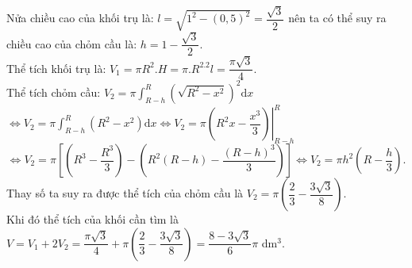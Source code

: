 \begin{ex}
{		Nửa chiều cao của khối trụ là: $l=\sqrt{1^2-(0,5)^2}=\dfrac{\sqrt{3}}{2}$ nên ta có thể suy ra chiều cao  của chỏm cầu là: $h=1-\dfrac{\sqrt{3}}{2}$.\\
		Thể tích khối  trụ là: $V_1=\pi R^2.H=\pi.R^2.2l=\dfrac{\pi \sqrt{3}}{4}$.\\
		Thể tích chỏm cầu: $V_2=\pi \displaystyle\int_{R-h}^R\left(\sqrt{R^2-x^2} \right)^2 \mathrm{d}x$ $\Leftrightarrow V_2=\pi \displaystyle\int_{R-h}^R\left(R^2-x^2\right)  \mathrm{d}x\Leftrightarrow V_2=\pi \left. \left(R^2x-\dfrac{x^3}{3} \right)\right|_{R-h}^R$
		\[\Leftrightarrow V_2=\pi \left[\left(R^3-\dfrac{R^3}{3} \right)-\left(R^2(R-h)-\dfrac{(R-h)^3}{3} \right)\right]\Leftrightarrow V_2=\pi  h^2\left(R-\dfrac{h}{3}\right).\]
		Thay số ta suy  ra được thể tích của chỏm cầu là $V_2=\pi \left(\dfrac{2}{3}-\dfrac{3\sqrt{3}}{8} \right)$.\\
		Khi đó thể tích của khối cần tìm  là $V=V_1+2V_2=\dfrac{\pi \sqrt{3}}{4}+\pi \left(\dfrac{2}{3}-\dfrac{3\sqrt{3}}{8} \right)=\dfrac{8-3\sqrt{3}}{6} \pi$ dm$^3$.
	 }
\end{ex}



